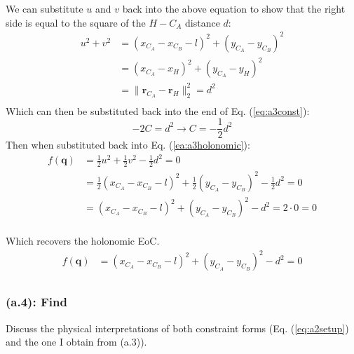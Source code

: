 \documentclass[titlepage]{article}
\begin{document}
We can substitute $u$ and $v$ back into the above equation to show that the right side is equal to the square of the $H-C_A$ distance $d$:
\begin{equation}
	\begin{split}
		u^2+v^2&=(x_{C_A}-x_{C_B}-l)^2+(y_{C_A}-y_{C_B})^2 \\
		&=(x_{C_A}-x_H)^2+(y_{C_A}-y_H)^2 \\
		&=\|\boldsymbol{r}_{C_A}-\boldsymbol{r}_H\|_2^2=d^2 \\
	\end{split}
\end{equation}
Which can then be substituted back into the end of Eq. (\ref{eq:a3const}):
\begin{equation}
	-2C=d^2 \to C=-\frac{1}{2}d^2
\end{equation}
Then when substituted back into Eq. (\ref{ea:a3holonomic}):
\begin{equation}
	\begin{split}
		f(\boldsymbol{q})&=\frac{1}{2}u^2+\frac{1}{2}v^2-\frac{1}{2}d^2=0 \\
		&=\frac{1}{2}(x_{C_A}-x_{C_B}-l)^2+\frac{1}{2}(y_{C_A}-y_{C_B})^2-\frac{1}{2}d^2=0 \\
		&=(x_{C_A}-x_{C_B}-l)^2+(y_{C_A}-y_{C_B})^2-d^2=2\cdot0=0 \\
	\end{split}
\end{equation}
\begin{mdframed}[linewidth=1pt, innertopmargin=10pt, innerbottommargin=10pt]
	Which recovers the holonomic EoC. 
	\begin{equation}
		\begin{split}
			f(\boldsymbol{q})&=(x_{C_A}-x_{C_B}-l)^2+(y_{C_A}-y_{C_B})^2-d^2=0 \\
		\end{split}
		\label{eq:a3answer}
	\end{equation}
\end{mdframed}

\subsubsection*{(a.4): Find}
Discuss the physical interpretations of both constraint forms (Eq. (\ref{eq:a2setup}) and the one I obtain from (a.3)).\\
\end{document}
